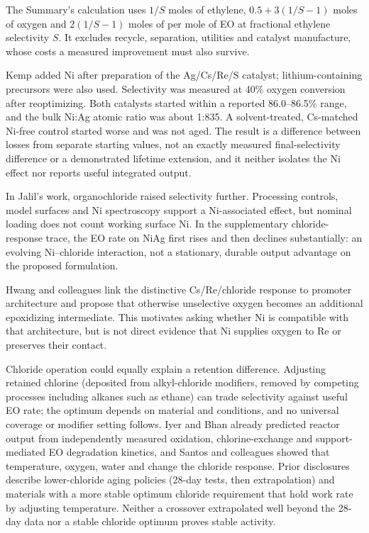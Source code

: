 The Summary's calculation uses $1/S$ moles of ethylene, $0.5+3(1/S-1)$ moles of oxygen and $2(1/S-1)$ moles of \COtwo{} per mole of EO at fractional ethylene selectivity $S$. It excludes recycle, separation, utilities and catalyst manufacture, whose costs a measured improvement must also survive.

Kemp added Ni after preparation of the Ag/Cs/Re/S catalyst; lithium-containing precursors were also used. Selectivity was measured at 40\% oxygen conversion after reoptimizing. Both catalysts started within a reported 86.0--86.5\% range, and the bulk Ni:Ag atomic ratio was about 1:835. A solvent-treated, Cs-matched Ni-free control started worse and was not aged. The result is a difference between losses from separate starting values, not an exactly measured final-selectivity difference or a demonstrated lifetime extension, and it neither isolates the Ni effect nor reports useful integrated output.\citep{kemp1995}

In Jalil's work, organochloride raised selectivity further. Processing controls, model surfaces and Ni spectroscopy support a Ni-associated effect, but nominal loading does not count working surface Ni. In the supplementary chloride-response trace, the EO rate on NiAg first rises and then declines substantially: an evolving Ni--chloride interaction, not a stationary, durable output advantage on the proposed formulation.\citep{jalil2025,jalil2025si}

Hwang and colleagues link the distinctive Cs/Re/chloride response to promoter architecture and propose that otherwise unselective oxygen becomes an additional epoxidizing intermediate. This motivates asking whether Ni is compatible with that architecture, but is not direct evidence that Ni supplies oxygen to Re or preserves their contact.\citep{hwang2026}

Chloride operation could equally explain a retention difference. Adjusting retained chlorine (deposited from alkyl-chloride modifiers, removed by competing processes including alkanes such as ethane) can trade selectivity against useful EO rate; the optimum depends on material and conditions, and no universal coverage or modifier setting follows.\citep{iyer2021} Iyer and Bhan already predicted reactor output from independently measured oxidation, chlorine-exchange and support-mediated EO degradation kinetics, and Santos and colleagues showed that temperature, oxygen, water and \COtwo{} change the chloride response.\citep{iyer2021,santos2024} Prior disclosures describe lower-chloride aging policies (28-day tests, then extrapolation) and materials with a more stable optimum chloride requirement that hold work rate by adjusting temperature. Neither a crossover extrapolated well beyond the 28-day data nor a stable chloride optimum proves stable activity.\citep{lee2024underchloride,modifier2024}

